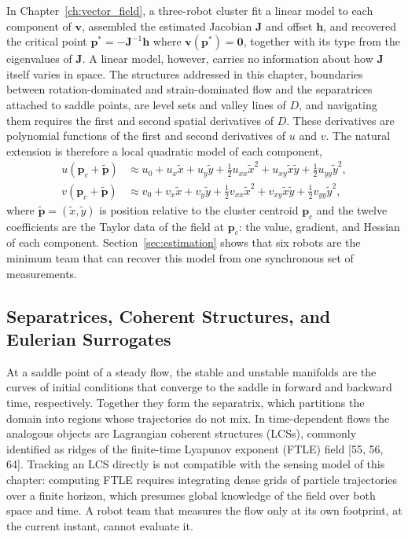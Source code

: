 \documentclass[12pt, letterpaper, oneside]{report}
\begin{document}
In Chapter~\ref{ch:vector_field}, a three-robot cluster fit a linear model
to each component of $\mathbf{v}$, assembled the estimated Jacobian
$\mathbf{J}$ and offset $\mathbf{h}$, and recovered the critical point
$\mathbf{p}^*=-\mathbf{J}^{-1}\mathbf{h}$ where $\mathbf{v}(\mathbf{p}^*)=\mathbf{0}$,
together with its type from the eigenvalues of $\mathbf{J}$. A linear
model, however, carries no information about how $\mathbf{J}$ itself
varies in space. The structures addressed in this chapter, boundaries
between rotation-dominated and strain-dominated flow and the separatrices
attached to saddle points, are level sets and valley lines of $D$, and
navigating them requires the first and second spatial derivatives of $D$.
These derivatives are polynomial functions of the first and second
derivatives of $u$ and $v$. The natural extension is therefore a local
quadratic model of each component,
\begin{align}
u(\mathbf{p}_c+\tilde{\mathbf{p}}) &\approx u_0 + u_x\tilde x + u_y\tilde y + \tfrac12 u_{xx}\tilde x^2 + u_{xy}\tilde x\tilde y + \tfrac12 u_{yy}\tilde y^2, \label{eq:quad_model_u} \\
v(\mathbf{p}_c+\tilde{\mathbf{p}}) &\approx v_0 + v_x\tilde x + v_y\tilde y + \tfrac12 v_{xx}\tilde x^2 + v_{xy}\tilde x\tilde y + \tfrac12 v_{yy}\tilde y^2, \label{eq:quad_model_v}
\end{align}
where $\tilde{\mathbf{p}}=(\tilde x,\tilde y)$ is position relative to the
cluster centroid $\mathbf{p}_c$ and the twelve coefficients are the Taylor
data of the field at $\mathbf{p}_c$: the value, gradient, and Hessian of
each component. Section~\ref{sec:estimation} shows that six robots are the
minimum team that can recover this model from one synchronous set of
measurements.

\subsection{Separatrices, Coherent Structures, and Eulerian Surrogates}
\label{sec:separatrix}

At a saddle point of a steady flow, the stable and unstable manifolds are
the curves of initial conditions that converge to the saddle in forward
and backward time, respectively. Together they form the separatrix, which
partitions the domain into regions whose trajectories do not mix. In
time-dependent flows the analogous objects are Lagrangian coherent
structures (LCSs), commonly identified as ridges of the finite-time
Lyapunov exponent (FTLE) field [55, 56, 64]. Tracking an LCS directly is
not compatible with the sensing model of this chapter: computing FTLE
requires integrating dense grids of particle trajectories over a finite
horizon, which presumes global knowledge of the field over both space and
time. A robot team that measures the flow only at its own footprint, at
the current instant, cannot evaluate it.
\end{document}

